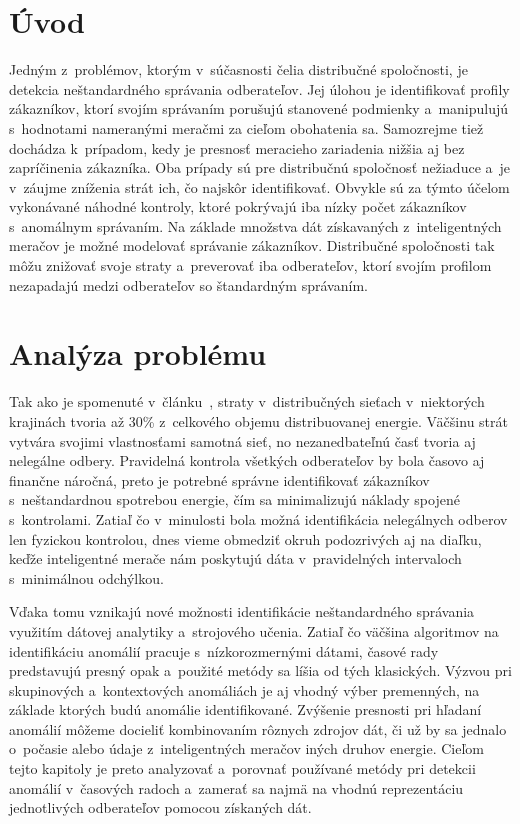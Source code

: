 \documentclass[a4paper,twoside,slovak,12pt,appendix]{article}
\begin{document}
\newpage
\setcounter{page}{1}
\section{Úvod}
Jedným z~problémov, ktorým v~súčasnosti čelia distribučné spoločnosti, je
detekcia neštandardného správania odberateľov. Jej úlohou je identifikovať
profily zákazníkov, ktorí svojím správaním porušujú stanovené podmienky
a~manipulujú s~hodnotami nameranými meračmi za cieľom obohatenia sa. Samozrejme
tiež dochádza k~prípadom, kedy je presnosť meracieho zariadenia nižšia aj bez
zapríčinenia zákazníka. Oba prípady sú pre distribučnú spoločnosť nežiaduce a~je
v~záujme zníženia strát ich, čo najskôr identifikovať. Obvykle sú za týmto
účelom vykonávané náhodné kontroly, ktoré pokrývajú iba nízky počet zákazníkov
s~anomálnym správaním. Na základe množstva dát získavaných z~inteligentných
meračov je možné modelovať správanie zákazníkov. Distribučné spoločnosti tak
môžu znižovať svoje straty a~preverovať iba odberateľov, ktorí svojím profilom
nezapadajú medzi odberateľov so štandardným správaním.



\newpage
\section{Analýza problému}
\label{c:problem-analysis}
Tak ako je spomenuté v~článku~\cite{Meffe2009}, straty v~distribučných sieťach
v~niektorých krajinách tvoria až 30\% z~celkového objemu distribuovanej energie.
Väčšinu strát vytvára svojimi vlastnosťami samotná sieť, no nezanedbateľnú časť
tvoria aj nelegálne odbery. Pravidelná kontrola všetkých odberateľov by bola
časovo aj finančne náročná, preto je potrebné správne identifikovať zákazníkov
s~neštandardnou spotrebou energie, čím sa minimalizujú náklady spojené
s~kontrolami. Zatiaľ čo v~minulosti bola možná identifikácia nelegálnych odberov
len fyzickou kontrolou, dnes vieme obmedziť okruh podozrivých aj na diaľku,
keďže inteligentné merače nám poskytujú dáta v~pravidelných intervaloch
s~minimálnou odchýlkou.

Vďaka tomu vznikajú nové možnosti identifikácie neštandardného správania
využitím dátovej analytiky a~strojového učenia. Zatiaľ čo väčšina algoritmov na
identifikáciu anomálií pracuje s~nízkorozmernými dátami, časové rady predstavujú
presný opak a~použité metódy sa líšia od tých klasických. Výzvou pri skupinových
a~kontextových anomáliách je aj vhodný výber premenných, na základe ktorých budú
anomálie identifikované. Zvýšenie presnosti pri hľadaní anomálií môžeme docieliť
kombinovaním rôznych zdrojov dát, či už by sa jednalo o~počasie alebo údaje
z~inteligentných meračov iných druhov energie. Cieľom tejto kapitoly je preto
analyzovať a~porovnať používané metódy pri detekcii anomálií v~časových radoch
a~zamerať sa najmä na vhodnú reprezentáciu jednotlivých odberateľov pomocou
získaných dát.
\end{document}
